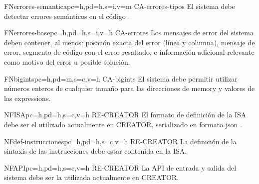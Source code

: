\begin{softwareReq}{FN}{errores-semantica}{pc=h,pd=h,s=i,v=m}
    {CA-errores-tipos}
    El sistema debe detectar errores semánticos en el código .
\end{softwareReq}

\begin{softwareReq}{FN}{errores-base}{pc=h,pd=h,s=i,v=h}
    {CA-errores}
    Los mensajes de error del sistema deben contener, al menos: posición exacta
    del error (línea y columna), mensaje de error, segmento de código con el
    error resaltado, e información adicional relevante como motivo del error u
    posible solución.
\end{softwareReq}


\begin{softwareReq}{FN}{bigints}{pc=h,pd=m,s=c,v=h}
    {CA-bigints}
    El sistema debe permitir utilizar números enteros de cualquier tamaño para
    las direcciones de \gls{memory} y valores de las \glspl{expression}.
\end{softwareReq}


\begin{softwareReq}{NF}{ISA}{pc=h,pd=h,s=c,v=h}
    {RE-CREATOR}
    El formato de definición de la \gls{ISA} debe ser el utilizado
    actualmente en CREATOR, serializado en formato \gls{json}
    \parencite{JSONStandard}. %
\end{softwareReq}

\begin{softwareReq}{NF}{def-instrucciones}{pc=h,pd=h,s=c,v=h}
    {RE-CREATOR}
    La definición de la sintaxis de las instrucciones debe estar contenida en la
    \gls{ISA}.
\end{softwareReq}

\begin{softwareReq}{NF}{API}{pc=h,pd=h,s=c,v=h}
    {RE-CREATOR}
    La \gls{API} de entrada y salida del sistema debe ser la utilizada
    actualmente en CREATOR.
\end{softwareReq}

